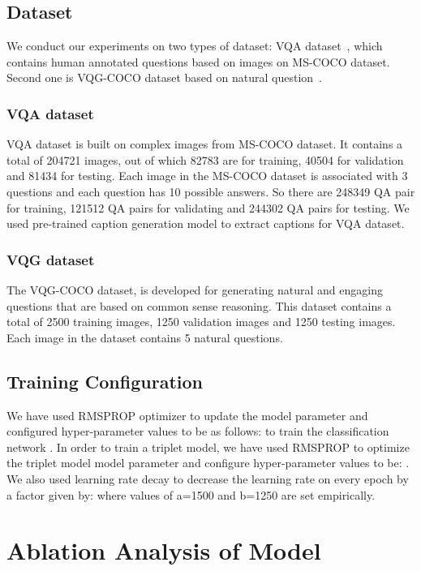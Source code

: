 \documentclass[11pt,a4paper]{article}
\begin{document}
\label{sec-3}
	\subsection{Dataset}
	We conduct our experiments on two types of dataset: VQA dataset~\cite{VQA}, which contains human annotated questions based on images on MS-COCO dataset. Second one is VQG-COCO dataset based on natural question~\cite{mostafazadeh2016generating}. 
	
	\subsubsection{VQA dataset}
	VQA dataset\cite{VQA} is built on complex images from MS-COCO dataset. It contains a total of 204721 images, out of which 82783 are for training, 40504 for validation and 81434 for testing. Each image in the MS-COCO dataset is associated with 3 questions and each question has 10 possible answers. So there are  248349 QA pair for training, 121512 QA pairs for validating and 244302 QA pairs for testing. We used pre-trained caption generation model \cite{Karpathy_NIPS2014} to extract captions for VQA dataset.

	\subsubsection{VQG dataset}
The VQG-COCO dataset\cite{mostafazadeh2016generating}, is developed for generating natural and engaging questions that are based on common sense reasoning. This dataset contains a total of 2500 training images, 1250 validation images and 1250 testing images. Each image in the dataset contains 5 natural questions. 


	\subsection{Training Configuration}
We have used RMSPROP  optimizer to update the model parameter and configured hyper-parameter values to be as follows: {} to train the classification network . In order to train a triplet model, we have used RMSPROP to  optimize the triplet model model parameter and configure hyper-parameter values to be: {}.
We also used learning rate decay to decrease the learning rate on every epoch by a factor given by:
 where values of a=1500 and b=1250 are set empirically. 


\section{Ablation Analysis of Model}
\end{document}
